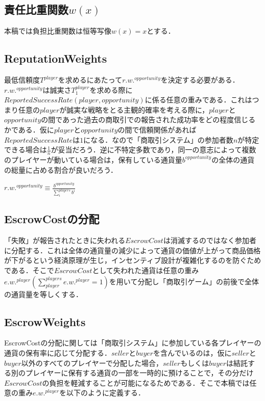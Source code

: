 \subsection{責任比重関数$ w(x) $}
本稿では負担比重関数は恒等写像$ w(x)=x $とする．

\subsection{ReputationWeights}
最低信頼度$ T^{player} $を求めるにあたって$ r.w.^{opportunity} $を決定する必要がある．$ r.w.^{opportunity} $は誠実さ$ T^{player}_1 $を求める際に$ ReportedSuccessRate(player, opportunity) $に係る任意の重みである．これはつまり任意の$ player $が誠実な戦略をとる主観的確率を考える際に，$ player $と$ opportunity $の間であった過去の商取引での報告された成功率をどの程度信じるかである．仮に$ player $と$ opportunity $の間で信頼関係があれば$ ReportedSuccessRate $は$ 1 $になる．なので「商取引システム」の参加者数$ n $が特定できる場合は$ \frac{1}{n} $が妥当だろう．逆に不特定多数であり，同一の意志によって複数のプレイヤーが動いている場合は，保有している通貨量$ b^{opportunity} $の全体の通貨の総量に占める割合が良いだろう．

$ r.w.^{opportunity} \equiv \frac{b^{opportunity}}{\sum^{players}_{i}b^{i}} $


\subsection{EscrowCostの分配}
「失敗」が報告されたときに失われる$ EscrowCost $は消滅するのではなく参加者に分配する．これは全体の通貨量の減少によって通貨の価値が上がって商品価格が下がるという経済原理が生じ，インセンティブ設計が複雑化するのを防ぐためである．そこで$ EscrowCost $として失われた通貨は任意の重み$ e.w.^{player} (\sum^{players}_{player}e.w.^{player} = 1) $を用いて分配し「商取引ゲーム」の前後で全体の通貨量を等しくする．

\subsection{EscrowWeights}
EscrowCostの分配に関しては「商取引システム」に参加している各プレイヤーの通貨の保有率に応じて分配する．$ seller $と$ buyer $を含んでいるのは，仮に$ seller $と$ buyer $以外のすべてのプレイヤーで分配した場合，$ seller $もしくは$ buyer $は結託する別のプレイヤーに保有する通貨の一部を一時的に預けることで，その分だけ$ EscrowCost $の負担を軽減することが可能になるためである．そこで本稿では任意の重み$ e.w.^{player} $を以下のように定義する．

